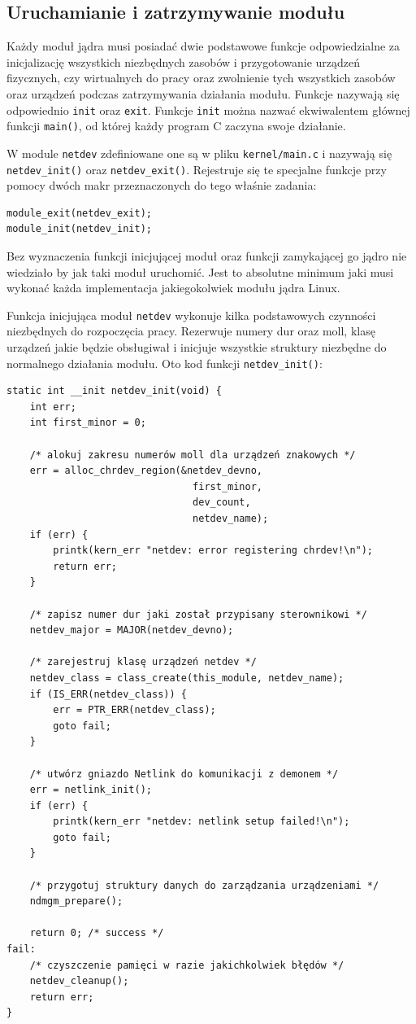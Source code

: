 \documentclass[11pt]{scrartcl}
\begin{document}
\subsection{Uruchamianie i zatrzymywanie modułu}

Każdy moduł jądra musi posiadać dwie podstawowe funkcje odpowiedzialne za inicjalizację wszystkich niezbędnych zasobów i przygotowanie urządzeń fizycznych, czy wirtualnych do pracy oraz zwolnienie tych wszystkich zasobów oraz urządzeń podczas zatrzymywania działania modułu. Funkcje nazywają się odpowiednio \texttt{init} oraz \texttt{exit}. Funkcje \texttt{init} można nazwać ekwiwalentem głównej funkcji \texttt{main()}, od której każdy program C zaczyna swoje działanie.

W module \texttt{netdev} zdefiniowane one są w pliku \texttt{kernel/main.c} i nazywają się \texttt{netdev\_init()} oraz \texttt{netdev\_exit()}. Rejestruje się te specjalne funkcje przy pomocy dwóch makr przeznaczonych do tego właśnie zadania:

\begin{verbatim}
module_exit(netdev_exit);
module_init(netdev_init);
\end{verbatim}

Bez wyznaczenia funkcji inicjującej moduł oraz funkcji zamykającej go jądro nie wiedziało by jak taki moduł uruchomić. Jest to absolutne minimum jaki musi wykonać każda implementacja jakiegokolwiek modułu jądra Linux.

Funkcja inicjująca moduł \texttt{netdev} wykonuje kilka podstawowych czynności niezbędnych do rozpoczęcia pracy. Rezerwuje numery dur oraz moll, klasę urządzeń jakie będzie obsługiwał i inicjuje wszystkie struktury niezbędne do normalnego działania modułu. Oto kod funkcji \texttt{netdev\_init()}:

\newpage
\begin{verbatim}
static int __init netdev_init(void) {
    int err;
    int first_minor = 0;

    /* alokuj zakresu numerów moll dla urządzeń znakowych */
    err = alloc_chrdev_region(&netdev_devno,
                                first_minor,
                                dev_count,
                                netdev_name);
    if (err) {
        printk(kern_err "netdev: error registering chrdev!\n");
        return err;
    }

    /* zapisz numer dur jaki został przypisany sterownikowi */
    netdev_major = MAJOR(netdev_devno);

    /* zarejestruj klasę urządzeń netdev */
    netdev_class = class_create(this_module, netdev_name);
    if (IS_ERR(netdev_class)) {
        err = PTR_ERR(netdev_class);
        goto fail;
    }

    /* utwórz gniazdo Netlink do komunikacji z demonem */
    err = netlink_init();
    if (err) {
        printk(kern_err "netdev: netlink setup failed!\n");
        goto fail;
    }

    /* przygotuj struktury danych do zarządzania urządzeniami */
    ndmgm_prepare();

    return 0; /* success */
fail:
    /* czyszczenie pamięci w razie jakichkolwiek błędów */
    netdev_cleanup();
    return err;
}
\end{verbatim}
\end{document}
